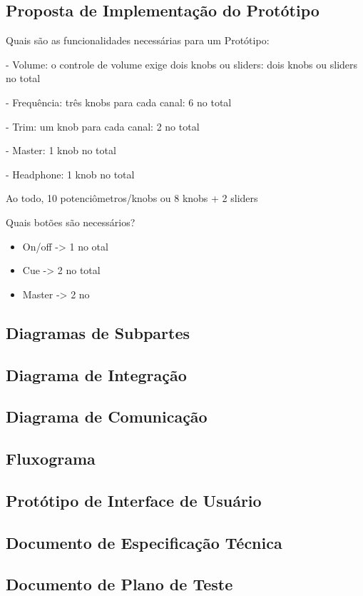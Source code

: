 \subsection{Proposta de Implementação do Protótipo}

Quais são as funcionalidades necessárias para um Protótipo:

- Volume: o controle de volume exige dois knobs ou sliders: dois knobs ou sliders no total

- Frequência: três knobs para cada canal: 6 no total

- Trim: um knob para cada canal: 2 no total

- Master: 1 knob no total

- Headphone: 1 knob no total

Ao todo, 10 potenciômetros/knobs ou 8 knobs + 2 sliders

Quais botões são necessários?

\begin{itemize}
	\item On/off -> 1 no otal
	\item Cue -> 2 no total
	\item Master -> 2 no
\end{itemize}

\subsection{Diagramas de Subpartes}
\subsection{Diagrama de Integração}
\subsection{Diagrama de Comunicação}
\subsection{Fluxograma}
\subsection{Protótipo de Interface de Usuário}
\subsection{Documento de Especificação Técnica}
\subsection{Documento de Plano de Teste}



